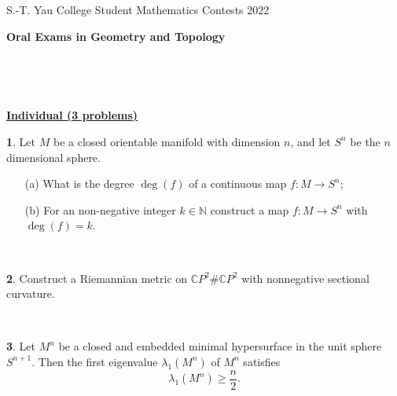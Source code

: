 \documentclass[12pt,a4paper]{amsart}
\theoremstyle{definition}
\newtheorem{problem}{}
\begin{document}
\begin{center}
S.-T. Yau College Student Mathematics Contests 2022\\

\vspace{0.1cm}

\Large {\bf Oral Exams in Geometry and Topology}




\end{center}

\

\

\begin{center}
\Large \underline{\bf Individual (3 problems)}

\end{center}

\setcounter{problem}{0} \vspace{1cm}



\begin{problem}

Let $M$ be a closed orientable manifold with dimension $%
n$, and let $S^{n}$ be the $n$ dimensional sphere.

\begin{itemize}
\item[(a)] What is the degree $\deg (f)$ of a continuous map
$f:M\rightarrow S^{n}$;

\item[(b)] For an non-negative integer $k\in \mathbb{N}$ construct a map $%
f:M\rightarrow S^{n}$ with $\deg (f)=k$.
\end{itemize}

\end{problem}

\

\begin{problem}

Construct a Riemannian metric on $\mathbb{C}P^2\#\mathbb{C}P^2$ with
nonnegative sectional curvature.

\end{problem}

\

\begin{problem}
Let $M^n$ be a closed and embedded minimal hypersurface in the unit
sphere $S^{n + 1}$. Then the first eigenvalue $\lambda_1 (M^n)$ of
$M^n$ satisfies
\[ \lambda_1 (M^n) \geqslant \frac{n}{2} . \]
\end{problem}
\end{document}
